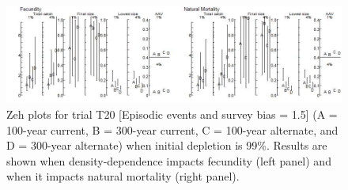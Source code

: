 \documentclass{article}\usepackage[]{graphicx}\usepackage[]{color}
\providecommand\phantomsection{}
\begin{document}
\begin{landscape}


\begin{figure}[H]
\centering
\includegraphics[]{SC66aRMP10_Part2_T20-D.jpeg}
\caption{
Zeh plots for trial T20
[Episodic events and survey bias = 1.5]
(A = 100-year current, B = 300-year current, C = 100-year alternate, and D = 300-year alternate)
when initial depletion is 99\%.
Results are shown when density-dependence impacts fecundity (left panel) and when it impacts natural mortality (right panel).
}
\end{figure}






\end{landscape}
\end{document}
